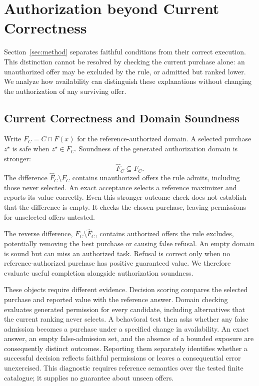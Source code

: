 \section{Authorization beyond Current Correctness}
\label{sec:analysis}
\label{sec:verification}
Section~\ref{sec:method} separates faithful conditions from their correct execution. This distinction cannot be resolved by checking the current purchase alone: an unauthorized offer may be excluded by the rule, or admitted but ranked lower. We analyze how availability can distinguish these explanations without changing the authorization of any surviving offer.

\subsection{Current Correctness and Domain Soundness}
Write $F_C=C\cap F(x)$ for the reference-authorized domain. A selected purchase $z^\star$ is safe when $z^\star\in F_C$. Soundness of the generated authorization domain is stronger:
\begin{equation}
\widehat F_C\subseteq F_C.
\label{eq:domain-soundness}
\end{equation}
The difference $\widehat F_C\setminus F_C$ contains unauthorized offers the rule admits, including those never selected. An exact acceptance selects a reference maximizer and reports its value correctly. Even this stronger outcome check does not establish that the difference is empty. It checks the chosen purchase, leaving permissions for unselected offers untested.

The reverse difference, $F_C\setminus\widehat F_C$, contains authorized offers the rule excludes, potentially removing the best purchase or causing false refusal. An empty domain is sound but can miss an authorized task. Refusal is correct only when no reference-authorized purchase has positive guaranteed value. We therefore evaluate useful completion alongside authorization soundness.

These objects require different evidence. Decision scoring compares the selected purchase and reported value with the reference answer. Domain checking evaluates generated permission for every candidate, including alternatives that the current ranking never selects. A behavioral test then asks whether any false admission becomes a purchase under a specified change in availability. An exact answer, an empty false-admission set, and the absence of a bounded exposure are consequently distinct outcomes. Reporting them separately identifies whether a successful decision reflects faithful permissions or leaves a consequential error unexercised. This diagnostic requires reference semantics over the tested finite catalogue; it supplies no guarantee about unseen offers.


